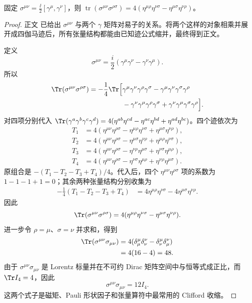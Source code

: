 \begin{lemma}
固定 $\sigma^{\mu\nu}=\frac{\ii}{2}[\gamma^\mu,\gamma^\nu]$，则 $\operatorname{tr}(\sigma^{\mu\nu}\sigma^{\rho\sigma})=4(\eta^{\mu\rho}\eta^{\nu\sigma}-\eta^{\mu\sigma}\eta^{\nu\rho})$。
\end{lemma}
\begin{proof}
正文 已给出 $\sigma^{\mu\nu}$ 与两个 $\gamma$ 矩阵对易子的关系。将两个这样的对象相乘并展开成四伽马迹后，所有张量结构都能由已知迹公式缩并，最终得到正文。



定义
\begin{equation*}
\sigma^{\mu\nu}=\frac{i}{2}(\gamma^\mu\gamma^\nu-\gamma^\nu\gamma^\mu).
\end{equation*}
所以
\begin{align*}
\Tr(\sigma^{\mu\nu}\sigma^{\rho\sigma})
=-\frac14\Tr\Big[&
\gamma^\mu\gamma^\nu\gamma^\rho\gamma^\sigma
-\gamma^\mu\gamma^\nu\gamma^\sigma\gamma^\rho\\
&-\gamma^\nu\gamma^\mu\gamma^\rho\gamma^\sigma
+\gamma^\nu\gamma^\mu\gamma^\sigma\gamma^\rho
\Big].
\end{align*}
对四项分别代入
\(
\Tr(\gamma^a\gamma^b\gamma^c\gamma^d)
=4(\eta^{ab}\eta^{cd}-\eta^{ac}\eta^{bd}+\eta^{ad}\eta^{bc})
\)。四个迹依次为
\begin{align*}
T_1&=4(\eta^{\mu\nu}\eta^{\rho\sigma}
-\eta^{\mu\rho}\eta^{\nu\sigma}
+\eta^{\mu\sigma}\eta^{\nu\rho}),\\
T_2&=4(\eta^{\mu\nu}\eta^{\rho\sigma}
-\eta^{\mu\sigma}\eta^{\nu\rho}
+\eta^{\mu\rho}\eta^{\nu\sigma}),\\
T_3&=4(\eta^{\mu\nu}\eta^{\rho\sigma}
-\eta^{\nu\rho}\eta^{\mu\sigma}
+\eta^{\nu\sigma}\eta^{\mu\rho}),\\
T_4&=4(\eta^{\mu\nu}\eta^{\rho\sigma}
-\eta^{\nu\sigma}\eta^{\mu\rho}
+\eta^{\nu\rho}\eta^{\mu\sigma}).
\end{align*}
原组合是 $-(T_1-T_2-T_3+T_4)/4$。代入后，四个
$\eta^{\mu\nu}\eta^{\rho\sigma}$ 项的系数为 $1-1-1+1=0$；其余两种张量结构分别收集为
\begin{align*}
-\frac14(T_1-T_2-T_3+T_4)
&=4\eta^{\mu\rho}\eta^{\nu\sigma}
-4\eta^{\mu\sigma}\eta^{\nu\rho}.
\end{align*}
因此
\begin{equation*}
{
\Tr(\sigma^{\mu\nu}\sigma^{\rho\sigma})
=4(\eta^{\mu\rho}\eta^{\nu\sigma}
-\eta^{\mu\sigma}\eta^{\nu\rho}).}
\end{equation*}
进一步令 $\rho=\mu$、$\sigma=\nu$ 并求和，得到
\begin{align*}
\Tr(\sigma^{\mu\nu}\sigma_{\mu\nu})
&=4(\delta^\mu_\mu\delta^\nu_\nu-\delta^\mu_\nu\delta^\nu_\mu)\\
&=4(16-4)=48.
\end{align*}
由于 $\sigma^{\mu\nu}\sigma_{\mu\nu}$ 是 Lorentz 标量并在不可约 Dirac 矩阵空间中与恒等式成正比，而 $\Tr I_4=4$，因此
\begin{equation*}
\sigma^{\mu\nu}\sigma_{\mu\nu}=12I_4.
\end{equation*}
这两个式子是磁矩、Pauli 形状因子和张量算符中最常用的 Clifford 收缩。
\end{proof}

